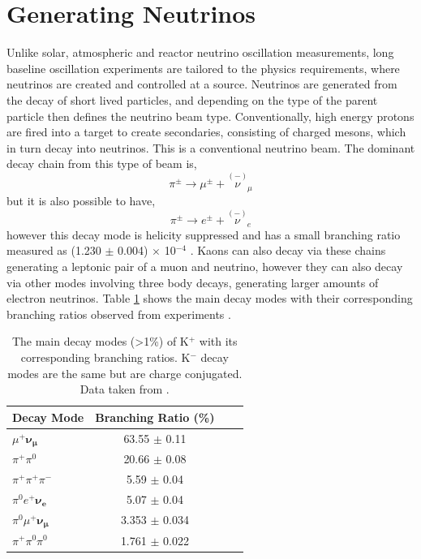 \section{Generating Neutrinos}
Unlike solar, atmospheric and reactor neutrino oscillation measurements, long baseline oscillation experiments are tailored to the physics requirements, where neutrinos are created and controlled at a source. Neutrinos are generated from the decay of short lived particles, and depending on the type of the parent particle then defines the neutrino beam type. Conventionally, high energy protons are fired into a target to create secondaries, consisting of charged mesons, which in turn decay into neutrinos. This is a conventional neutrino beam. The dominant decay chain from this type of beam is,
\begin{equation}
\pi^{\pm} \rightarrow \mu^{\pm} + \overset{(-)}{\nu}_{\mu}
\end{equation}
but it is also possible to have,
\vspace{-4mm}
\begin{equation}
\pi^{\pm} \rightarrow e^{\pm} + \overset{(-)}{\nu}_{e}
\end{equation} 
however this decay mode is helicity suppressed and has a small branching ratio measured as (1.230 $\pm$ 0.004) $\times$ 10$^{-4}$ \cite{pionDecayModes}. Kaons can also decay via these chains generating a leptonic pair of a muon and neutrino, however they can also decay via other modes involving three body decays, generating larger amounts of electron neutrinos. Table \ref{tab:kaonDecayModes} shows the main decay modes with their corresponding branching ratios observed from experiments \cite{kaonDecayModes}. 
\begin{table}[htbp]
\begin{center}
  \begin{tabular}{l*{2}{c}r}
  \hline
  \textbf{Decay Mode} & \textbf{Branching Ratio (\%)}\\
    \hline
    \hline
    $\mu^{+}\boldsymbol{\nu_{\mu}}$ & 63.55 $\pm$ 0.11\\
    $\pi^{+}\pi^{0}$ & 20.66 $\pm$ 0.08\\
    $\pi^{+}\pi^{+}\pi^{-}$ & 5.59 $\pm$ 0.04\\
    $\pi^{0}e^{+}\boldsymbol{\nu_{e}}$ & 5.07 $\pm$ 0.04\\
    $\pi^{0}\mu^{+}\boldsymbol{\nu_{\mu}}$ & 3.353 $\pm$ 0.034\\
    $\pi^{+}\pi^{0}\pi^{0}$ & 1.761 $\pm$ 0.022\\
    \hline
  \end{tabular}
      \caption{The main decay modes (>1\%) of K$^{+}$ with its corresponding branching ratios. K$^{-}$ decay modes are the same but are charge conjugated. Data taken from \cite{kaonDecayModes}.}
    \label{tab:kaonDecayModes}
\end{center}
    \end{table}
    
